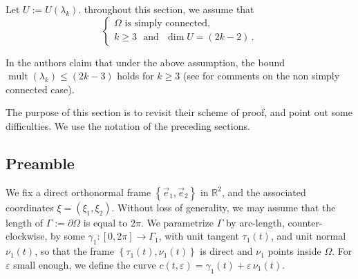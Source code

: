 \documentclass[12pt,a4paper]{amsart}
\theoremstyle{plain} %
\theoremstyle{definition}
\numberwithin{equation}{section}
\numberwithin{figure}{section}
\numberwithin{table}{section}
\newcommand{\R}{\mathbb{R}}
\DeclareMathOperator{\mult}{mult}
\newcommand{\set}[1]{\left\lbrace #1 \right\rbrace}
\begin{document}
Let $U := U(\lambda_k)$. throughout this section, we assume that
%
\begin{equation}\label{E-hmn6-0}
\left\{
\begin{array}{l}
\Omega \text{~is simply connected,}\\[5pt]
k \ge 3 \text{~~and~~} \dim U = (2k-2)\,.
\end{array}
\right.
\end{equation}

In \cite[Theorem~B]{HoMN1999} the authors claim that under the above assumption, the bound $\mult(\lambda_k) \le (2k-3)$ holds for $k \ge 3$ (see \cite[Section~4]{Berd2018} for comments on the non simply connected case).\smallskip

The purpose of this section is to revisit their scheme of proof, and point out some difficulties. We use the notation of the preceding sections.

\subsection{Preamble}\label{SS-hmn6-1}

We fix a direct orthonormal frame $\set{\vec{e}_1, \vec{e}_2}$ in $\R^2$, and the associated coordinates $\xi = (\xi_1,\xi_2)$. Without loss of generality, we may assume that the length of $\Gamma := \partial \Omega$ is equal to $2\pi$. We parametrize $\Gamma$ by arc-length, counter-clockwise, by some $\gamma_1 : [0,2\pi] \to \Gamma_1$, with unit tangent $\tau_1(t)$, and unit normal $\nu_1(t)$, so that the frame $\set{\tau_1(t),\nu_1(t)}$ is direct and $\nu_1$ points inside $\Omega$. For $\varepsilon$ small enough, we define the curve $c(t,\varepsilon) = \gamma_1(t) +\varepsilon\, \nu_1(t)$.\smallskip
\end{document}
